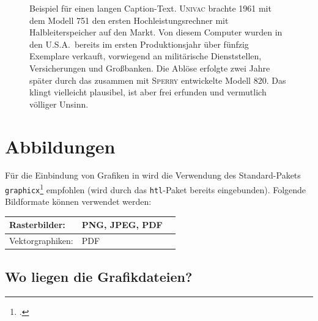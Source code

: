 \begin{figure}
\centering
{}
\caption{Beispiel für einen langen Caption-Text. \textsc{Univac}
brachte 1961 mit dem Modell 751 den ersten Hochleistungsrechner
mit Halbleiterspeicher auf den Markt. Von diesem Computer wurden
in den U.S.A.\ bereits im ersten Produktionsjahr über fünfzig
Exemplare verkauft, vorwiegend an militärische Dienststellen,
Versicherungen und Großbanken. Die Ablöse erfolgte zwei Jahre
später durch das zusammen mit \textsc{Sperry} entwickelte Modell 820.
Das klingt vielleicht plausibel, ist aber frei erfunden und
vermutlich völliger Unsinn.} 
\label{fig:univac}
\end{figure}





\section{Abbildungen}

Für die Einbindung von Grafiken in \latex wird die Verwendung des Stan\-dard-Pakets
\texttt{graphicx}\footcite{Carlisle99} empfohlen 
(wird durch das \texttt{htl}-Paket bereits eingebunden). 
Folgende Bildformate können verwendet werden:
%
\begin{center}
\begin{tabular}{|l|l|l|}
\hline
Rasterbilder:    & PNG, JPEG, PDF \\
\hline
Vektorgraphiken: & PDF \\
\hline
\end{tabular}
\end{center}
%

\subsection{Wo liegen die Grafikdateien?} 


